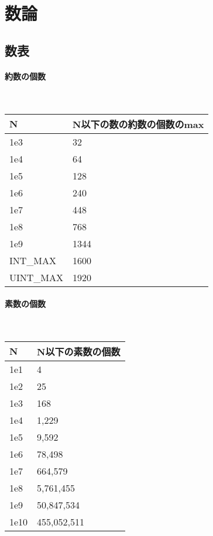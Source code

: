 \section{数論}

\subsection{数表}

\paragraph{約数の個数}　

\begin{tabular}{|l|l|}
\hline
N & N以下の数の約数の個数のmax \\ \hline
1e3 & 32 \\ \hline
1e4 & 64 \\ \hline
1e5 & 128 \\ \hline
1e6 & 240 \\ \hline
1e7 & 448 \\ \hline
1e8 & 768 \\ \hline
1e9 & 1344 \\ \hline
INT\_MAX & 1600 \\ \hline
UINT\_MAX & 1920 \\ \hline
\end{tabular}



\paragraph{素数の個数}　

\begin{tabular}{|l|l|}
\hline
N & N以下の素数の個数 \\ \hline
1e1 & 4 \\ \hline
1e2 & 25 \\ \hline
1e3 & 168 \\ \hline
1e4 & 1,229 \\ \hline
1e5 & 9,592 \\ \hline
1e6 & 78,498 \\ \hline
1e7 & 664,579 \\ \hline
1e8 & 5,761,455 \\ \hline
1e9 & 50,847,534 \\ \hline
1e10 & 455,052,511 \\ \hline

\end{tabular}


